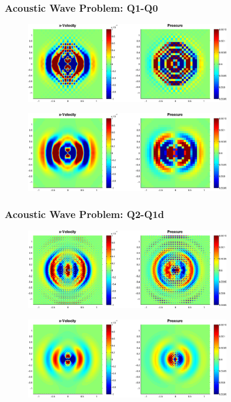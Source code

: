 \documentclass[8pt,xcolor=svgnames]{beamer}
\begin{document}
\begin{frame}
 \frametitle{Acoustic Wave Problem: Q1-Q0}
   \begin{figure}[h!]
    \centering
    \includegraphics[width=0.8\textwidth,keepaspectratio=true]{./Images/acousticQ1Q0_hgOFF.png}
    \end{figure}
   \begin{figure}[h!]
    \centering
    \includegraphics[width=0.8\textwidth,keepaspectratio=true]{./Images/acousticQ1Q0_hgON.png}
    \end{figure}
\end{frame}

\begin{frame}
 \frametitle{Acoustic Wave Problem: Q2-Q1d}
   \begin{figure}[h!]
    \centering
    \includegraphics[width=0.8\textwidth,keepaspectratio=true]{./Images/acousticQ2Q1_hgOFF.png}
    \end{figure}
   \begin{figure}[h!]
    \centering
    \includegraphics[width=0.8\textwidth,keepaspectratio=true]{./Images/acousticQ2Q1_hgON.png}
    \end{figure}
\end{frame}
\end{document}
